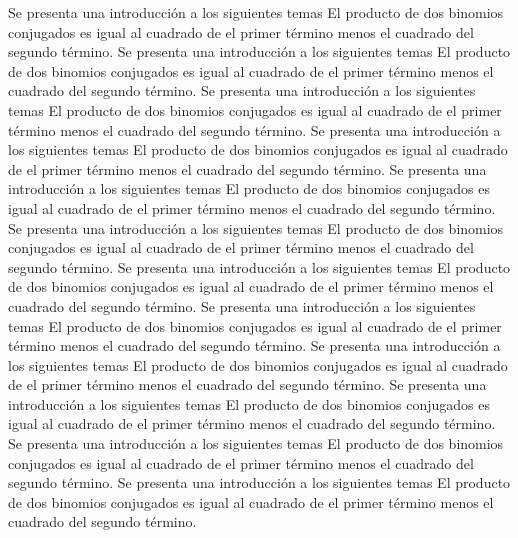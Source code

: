 Se presenta una introducción a los siguientes temas El producto de dos binomios conjugados es igual al cuadrado de el primer término menos el cuadrado del segundo término.
Se presenta una introducción a los siguientes temas El producto de dos binomios conjugados es igual al cuadrado de el primer término menos el cuadrado del segundo término.
Se presenta una introducción a los siguientes temas El producto de dos binomios conjugados es igual al cuadrado de el primer término menos el cuadrado del segundo término.
Se presenta una introducción a los siguientes temas El producto de dos binomios conjugados es igual al cuadrado de el primer término menos el cuadrado del segundo término.
Se presenta una introducción a los siguientes temas El producto de dos binomios conjugados es igual al cuadrado de el primer término menos el cuadrado del segundo término.
Se presenta una introducción a los siguientes temas El producto de dos binomios conjugados es igual al cuadrado de el primer término menos el cuadrado del segundo término.
Se presenta una introducción a los siguientes temas El producto de dos binomios conjugados es igual al cuadrado de el primer término menos el cuadrado del segundo término.
Se presenta una introducción a los siguientes temas El producto de dos binomios conjugados es igual al cuadrado de el primer término menos el cuadrado del segundo término.
Se presenta una introducción a los siguientes temas El producto de dos binomios conjugados es igual al cuadrado de el primer término menos el cuadrado del segundo término.
Se presenta una introducción a los siguientes temas El producto de dos binomios conjugados es igual al cuadrado de el primer término menos el cuadrado del segundo término.
Se presenta una introducción a los siguientes temas El producto de dos binomios conjugados es igual al cuadrado de el primer término menos el cuadrado del segundo término.
Se presenta una introducción a los siguientes temas El producto de dos binomios conjugados es igual al cuadrado de el primer término menos el cuadrado del segundo término.
